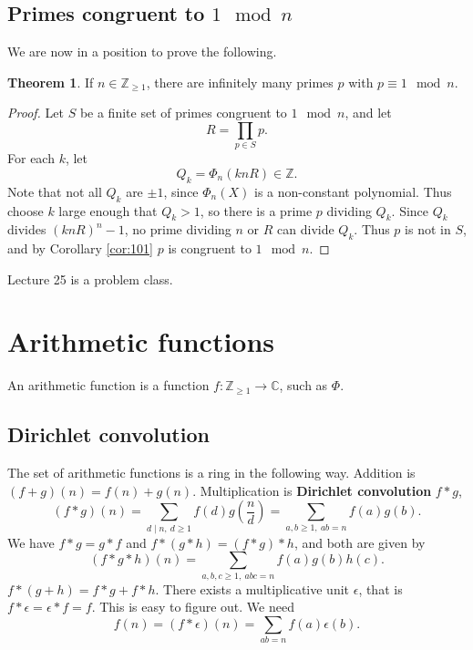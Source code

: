 \documentclass{article}
\newcommand{\Z}{\mathbb{Z}}
\newcommand{\C}{\mathbb{C}}
\newcommand{\rb}[1]{\left( #1 \right)}
\theoremstyle{definition}\newtheorem{definition}{Definition}
\theoremstyle{definition}\newtheorem{remark}[definition]{Remark}
\theoremstyle{definition}\newtheorem*{example}{Example}
\theoremstyle{definition}\newtheorem*{note}{Note}
\newtheorem{theorem}[definition]{Theorem}
\begin{document}
\subsection{Primes congruent to $ 1 \mod n $}

We are now in a position to prove the following.

\begin{theorem}
If $ n \in \Z_{\ge 1} $, there are infinitely many primes $ p $ with $ p \equiv 1 \mod n $.
\end{theorem}

\begin{proof}
Let $ S $ be a finite set of primes congruent to $ 1 \mod n $, and let
$$ R = \prod_{p \in S} p. $$
For each $ k $, let
$$ Q_k = \Phi_n\rb{knR} \in \Z. $$
Note that not all $ Q_k $ are $ \pm 1 $, since $ \Phi_n\rb{X} $ is a non-constant polynomial. Thus choose $ k $ large enough that $ Q_k > 1 $, so there is a prime $ p $ dividing $ Q_k $. Since $ Q_k $ divides $ \rb{knR}^n - 1 $, no prime dividing $ n $ or $ R $ can divide $ Q_k $. Thus $ p $ is not in $ S $, and by Corollary \ref{cor:101} $ p $ is congruent to $ 1 \mod n $.
\end{proof}


Lecture 25 is a problem class.

\pagebreak


\section{Arithmetic functions}

An arithmetic function is a function $ f : \Z_{\ge 1} \to \C $, such as $ \Phi $.

\subsection{Dirichlet convolution}

The set of arithmetic functions is a ring in the following way. Addition is $ \rb{f + g}\rb{n} = f\rb{n} + g\rb{n} $. Multiplication is \textbf{Dirichlet convolution} $ f * g $,
$$ \rb{f * g}\rb{n} = \sum_{d \mid n, \ d \ge 1} f\rb{d}g\rb{\dfrac{n}{d}} = \sum_{a, b \ge 1, \ ab = n} f\rb{a}g\rb{b}. $$
We have $ f * g = g * f $ and $ f * \rb{g * h} = \rb{f * g} * h $, and both are given by
$$ \rb{f * g * h}\rb{n} = \sum_{a, b, c \ge 1, \ abc = n} f\rb{a}g\rb{b}h\rb{c}. $$
$ f * \rb{g + h} = f * g + f * h $. There exists a multiplicative unit $ \epsilon $, that is $ f * \epsilon = \epsilon * f = f $. This is easy to figure out. We need
$$ f\rb{n} = \rb{f * \epsilon}\rb{n} = \sum_{ab = n} f\rb{a}\epsilon\rb{b}. $$
\end{document}
